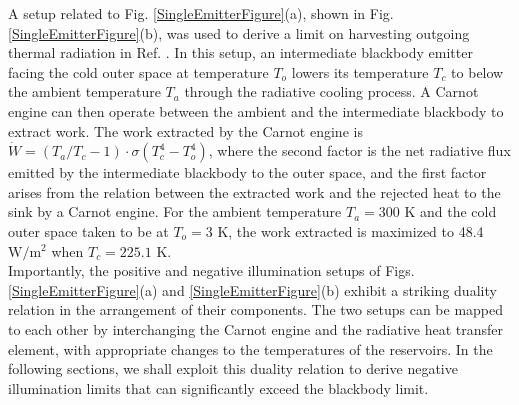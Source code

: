 \documentclass[notitlepage,onecolumn,aps,showpacs,preprintnumbers,amsmath,amssymb,superscriptaddress]{revtex4-1}
\begin{document}
A setup related to Fig. \ref{SingleEmitterFigure}(a), shown in Fig. \ref{SingleEmitterFigure}(b), was used to derive a limit on harvesting outgoing thermal radiation in Ref. \citep{capasso}. In this setup, an intermediate blackbody emitter facing the cold outer space at temperature $T_o$ lowers its temperature $T_c$ to below the ambient temperature $T_a$ through the radiative cooling process. A Carnot engine can then operate between the ambient and the intermediate blackbody to extract work. The work extracted by the Carnot engine is $\dot{W}=(T_a/T_c-1)\cdot \sigma(T_c^4-T_o^4)$, where the second factor is the net radiative flux emitted by the intermediate blackbody to the outer space, and the first factor arises from the relation between the extracted work and the rejected heat to the sink by a Carnot engine. For the ambient temperature $T_a = 300$ K and the cold outer space taken to be at $T_o = 3$ K, the work extracted is maximized to 48.4 $\mathrm{W/m^2}$ when $T_c = 225.1$ K. \\

Importantly, the positive and negative illumination setups of Figs. \ref{SingleEmitterFigure}(a) and \ref{SingleEmitterFigure}(b) exhibit a striking duality relation in the arrangement of their components. The two setups can be mapped to each other by interchanging the Carnot engine and the radiative heat transfer element, with appropriate changes to the temperatures of the reservoirs. In the following sections, we shall exploit this duality relation to derive negative illumination limits that can significantly exceed the blackbody limit. 
\end{document}
